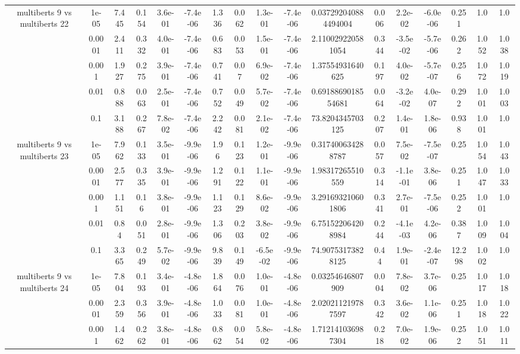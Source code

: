 \begin{tabular}{|c|c|c|c|c|c|c|c|c|c|c|c|c|c|c|c|c|}
\hline
\multirow{5}{*}{multiberts 9 vs multiberts 22} & 1e-05 & 7.445 & 0.154 & 3.6e-01 & -7.4e-06 & 1.336 & 0.062 & 1.3e-01 & -7.4e-06 & 0.037292040884494004 & 0.006 & 2.2e-02 & -6.0e-06 & 0.251 & 1.0 & 1.0 \\
 & 0.0001 & 2.411 & 0.332 & 4.0e-01 & -7.4e-06 & 0.683 & 0.053 & 1.5e-01 & -7.4e-06 & 2.110029220581054 & 0.344 & -3.5e-02 & -5.7e-06 & 0.262 & 1.052 & 1.038 \\
 & 0.001 & 1.927 & 0.275 & 3.9e-01 & -7.4e-06 & 0.741 & 0.07 & 6.9e-02 & -7.4e-06 & 1.37554931640625 & 0.197 & 4.0e-02 & -5.7e-07 & 0.256 & 1.072 & 1.019 \\
 & 0.01 & 0.888 & 0.063 & 2.5e-01 & -7.4e-06 & 0.752 & 0.049 & 5.7e-02 & -7.4e-06 & 0.6918869018554681 & 0.064 & -3.2e-02 & 4.0e-07 & 0.292 & 1.001 & 1.003 \\
 & 0.1 & 3.188 & 0.267 & 7.8e-02 & -7.4e-06 & 2.242 & 0.081 & 2.1e-02 & -7.4e-06 & 73.8204345703125 & 0.207 & 1.4e-01 & 1.8e-06 & 0.938 & 1.001 & 1.0 \\
\hline
\multirow{5}{*}{multiberts 9 vs multiberts 23} & 1e-05 & 7.962 & 0.133 & 3.5e-01 & -9.9e-06 & 1.96 & 0.123 & 1.2e-01 & -9.9e-06 & 0.317400634288787 & 0.057 & 7.5e-02 & -7.5e-07 & 0.25 & 1.054 & 1.043 \\
 & 0.0001 & 2.577 & 0.335 & 3.9e-01 & -9.9e-06 & 1.291 & 0.122 & 1.1e-01 & -9.9e-06 & 1.98317265510559 & 0.314 & -1.1e-01 & 3.8e-06 & 0.251 & 1.047 & 1.033 \\
 & 0.001 & 1.151 & 0.16 & 3.8e-01 & -9.9e-06 & 1.123 & 0.129 & 8.6e-02 & -9.9e-06 & 3.291693210601806 & 0.341 & 2.7e-01 & -7.5e-06 & 0.252 & 1.001 & 1.0 \\
 & 0.01 & 0.84 & 0.051 & 2.8e-01 & -9.9e-06 & 1.306 & 0.203 & 3.8e-02 & -9.9e-06 & 6.751522064208984 & 0.244 & -4.1e-03 & 4.2e-06 & 0.387 & 1.009 & 1.004 \\
 & 0.1 & 3.365 & 0.249 & 5.7e-02 & -9.9e-06 & 9.839 & 0.149 & -6.5e-02 & -9.9e-06 & 74.90753173828125 & 0.44 & 1.9e-01 & -2.4e-07 & 12.298 & 1.002 & 1.0 \\
\hline
\multirow{5}{*}{multiberts 9 vs multiberts 24} & 1e-05 & 7.804 & 0.193 & 3.4e-01 & -4.8e-06 & 1.864 & 0.076 & 1.0e-01 & -4.8e-06 & 0.03254646807909 & 0.004 & 7.8e-02 & 3.7e-06 & 0.25 & 1.017 & 1.018 \\
 & 0.0001 & 2.359 & 0.356 & 3.9e-01 & -4.8e-06 & 1.033 & 0.081 & 1.0e-01 & -4.8e-06 & 2.020211219787597 & 0.342 & 3.6e-02 & 1.1e-06 & 0.251 & 1.018 & 1.022 \\
 & 0.001 & 1.462 & 0.262 & 3.8e-01 & -4.8e-06 & 0.862 & 0.054 & 5.8e-02 & -4.8e-06 & 1.712141036987304 & 0.218 & 7.0e-02 & 1.9e-06 & 0.252 & 1.051 & 1.011 \\

\end{tabular}
